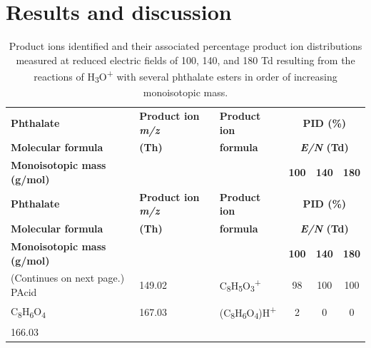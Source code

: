 \section{Results and discussion}

















{\small

\begin{longtable}[c]{lllccc}
\caption{Product ions identified and their associated percentage product ion distributions measured at reduced electric fields of 100, 140, and 180 Td resulting
from the reactions of H\textsubscript{3}O\textsuperscript{+} with several phthalate esters in order of increasing monoisotopic mass.} 
\label{table:PID}\\
\hline 
\textbf{Phthalate}& \textbf{Product ion \textit{m/z}} & \textbf{Product ion}  & \multicolumn{3}{c}{\textbf{PID (\%)}} \\ \cline{4-6} 
\textbf{Molecular formula} &\textbf{(Th)}&   \textbf{formula }& \multicolumn{3}{c}{\textbf{\textit{E/N} (Td)}} \\ \cline{4-6} 
\textbf{Monoisotopic mass (g/mol)  }      &                      &                     & \textbf{100 }     & \textbf{140}     & \textbf{180}  \\
\hline
\endfirsthead
\hline 
\textbf{Phthalate}& \textbf{Product ion \textit{m/z}} & \textbf{Product ion}  & \multicolumn{3}{c}{\textbf{PID (\%)}} \\ \cline{4-6} 
\textbf{Molecular formula} &\textbf{(Th)}&   \textbf{formula }& \multicolumn{3}{c}{\textbf{\textit{E/N} (Td)}} \\ \cline{4-6} 
\textbf{Monoisotopic mass (g/mol)  }      &                      &                     & \textbf{100 }     & \textbf{140}     & \textbf{180}  \\
\hline
\endhead
%
  (Continues on next page.)
\endfoot
%
\endlastfoot
PAcid   & 149.02  & C\textsubscript{8}H\textsubscript{5}O\textsubscript{3}\textsuperscript{+}  & 98  & 100  & 100   \\
C\textsubscript{8}H\textsubscript{6}O\textsubscript{4}  & 167.03  & (C\textsubscript{8}H\textsubscript{6}O\textsubscript{4})H\textsuperscript{+}  & 2  & 0  & 0  \\
166.03  & & & & &  \\

\end{longtable}}

